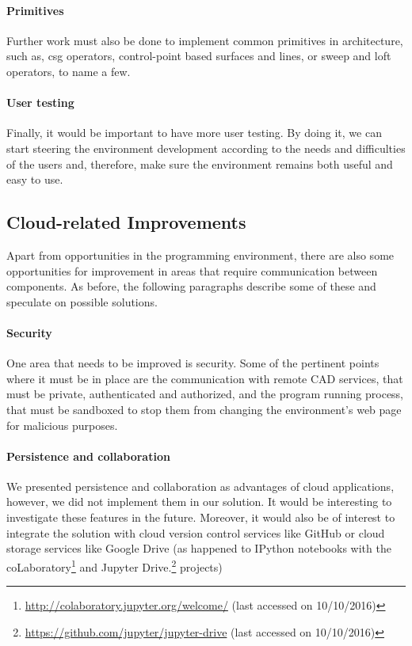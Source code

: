 \paragraph{Primitives}
Further work must also be done to implement common primitives in architecture, such as, \gls{csg} operators, control-point based surfaces and lines, or sweep and loft operators, to name a few.

\paragraph{User testing}
Finally, it would be important to have more user testing.
By doing it, we can start steering the environment development according to the needs and difficulties of the users and, therefore, make sure the environment remains both useful and easy to use.


\subsection{Cloud-related Improvements}
Apart from opportunities in the programming environment, there are also some opportunities for improvement in areas that require communication between components.
As before, the following paragraphs describe some of these and speculate on possible solutions.

\paragraph{Security}
One area that needs to be improved is security.
Some of the pertinent points where it must be in place are the communication with remote CAD services, that must be private, authenticated and authorized, and the program running process, that must be sandboxed to stop them from changing the environment's web page for malicious purposes.

\paragraph{Persistence and collaboration}
We presented persistence and collaboration as advantages of cloud applications, however, we did not implement them in our solution.
It would be interesting to investigate these features in the future.
Moreover, it would also be of interest to integrate the solution with cloud version control services like GitHub or cloud storage services like Google Drive (as happened to IPython notebooks with the coLaboratory\footnote{\url{http://colaboratory.jupyter.org/welcome/} (last accessed on 10/10/2016)} and Jupyter Drive.\footnote{\url{https://github.com/jupyter/jupyter-drive} (last accessed on 10/10/2016)} projects)

